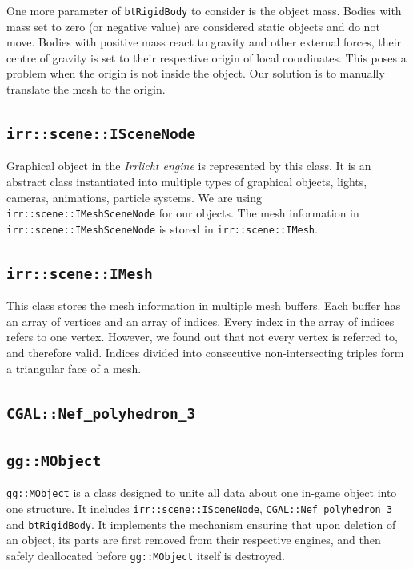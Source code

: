 One more parameter of {\tt btRigidBody} to consider is the object mass. Bodies with mass set to zero (or negative value) are considered static objects and do not move. Bodies with positive mass react to gravity and other external forces, their centre of gravity is set to their respective origin of local coordinates. This poses a problem when the origin is not inside the object. Our solution is to manually translate the mesh to the origin. 

\subsection*{\tt irr::scene::ISceneNode} 
Graphical object in the \emph{Irrlicht engine} is represented by this class. It is an abstract class instantiated into multiple types of graphical objects, \eg lights, cameras, animations, particle systems. We are using {\tt irr::scene::IMeshSceneNode} for our objects. The mesh information in {\tt irr::scene::IMeshSceneNode} is stored in {\tt irr::scene::IMesh}. 

\subsection*{\tt irr::scene::IMesh} 
This class stores the mesh information in multiple mesh buffers. Each buffer has an array of vertices and an array of indices. Every index in the array of indices refers to one vertex. However, we found out that not every vertex is referred to, and therefore valid. Indices divided into consecutive non-intersecting triples form a triangular face of a mesh. 

\subsection*{\tt CGAL::Nef\_polyhedron\_3}

\subsection*{\tt gg::MObject} 
{\tt gg::MObject} is a class designed to unite all data about one in-game object into one structure. It includes {\tt irr::scene::ISceneNode}, {\tt CGAL::Nef\_polyhedron\_3} and {\tt btRigidBody}. It implements the mechanism ensuring that upon deletion of an object, its parts are first removed from their respective engines, and then safely deallocated before {\tt gg::MObject} itself is destroyed.


